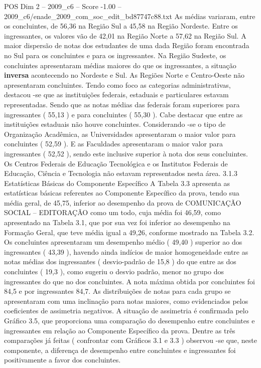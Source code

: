 \begin{textsample}{POS Dim 2 – 2009\_c6 – Score -1.00 – 2009\_c6/enade\_2009\_com\_soc\_edit\_bd87747c88.txt}
As médias variaram, entre os concluintes, de 56,36 na Região Sul a 45,58 na Região Nordeste.
Entre os ingressantes, os valores vão de 42,01 na Região Norte a 57,62 na Região Sul.
A maior dispersão de notas dos estudantes de uma dada Região foram encontrada no Sul para os concluintes e para os ingressantes.
Na Região Sudeste, os concluintes apresentaram médias maiores do que os ingressantes, a situação \textbf{inversa} acontecendo no Nordeste e Sul.
As Regiões Norte e Centro-Oeste não apresentaram concluintes.
Tendo como foco as categorias administrativas, destacou -se que as instituições federais, estaduais e particulares estavam representadas.
Sendo que as notas médias das federais foram superiores para ingressantes ( 55,13 ) e para concluintes ( 55,30 ).
Cabe destacar que entre as instituições estaduais não houve concluintes.
Considerando -se o tipo de Organização Acadêmica, as Universidades apresentaram o maior valor para concluintes ( 52,59 ).
E as Faculdades apresentaram o maior valor para ingressantes ( 52,52 ), sendo este inclusive superior à nota dos seus concluintes.
Os Centros Federais de Educação Tecnológica e os Institutos Federais de Educação, Ciência e Tecnologia não estavam representados nesta área. 3.1.3 Estatísticas Básicas do Componente Específico A Tabela 3.3 apresenta as estatísticas básicas referentes ao Componente Específico da prova, tendo sua média geral, de 45,75, inferior ao desempenho da prova de COMUNICAÇÃO SOCIAL – EDITORAÇÃO como um todo, cuja média foi 46,59, como apresentado na Tabela 3.1, que por sua vez foi inferior ao desempenho na Formação Geral, que teve média igual a 49,26, conforme mostrado na Tabela 3.2.
Os concluintes apresentaram um desempenho médio ( 49,40 ) superior ao dos ingressantes ( 43,39 ), havendo ainda indícios de maior homogeneidade entre as notas médias dos ingressantes ( desvio-padrão de 15,8 ) do que entre as dos concluintes ( 19,3 ), como sugeriu o desvio padrão, menor no grupo dos ingressantes do que no dos concluintes.
A nota máxima obtida por concluintes foi 84,5 e por ingressantes 84,7.
As distribuições de notas para cada grupo se apresentaram com uma inclinação para notas maiores, como evidenciados pelos coeficientes de assimetria negativos.
A situação de assimetria é confirmada pelo Gráfico 3.5, que proporciona uma comparação do desempenho entre concluintes e ingressantes em relação ao Componente Específico da prova.
Dentre as três comparações já feitas ( confrontar com Gráficos 3.1 e 3.3 ) observou -se que, neste componente, a diferença de desempenho entre concluintes e ingressantes foi positivamente a favor dos concluintes.

\end{textsample}

